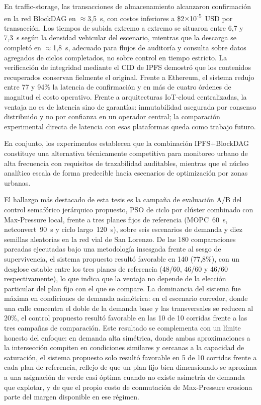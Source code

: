 En traffic-storage, las transacciones de almacenamiento alcanzaron confirmación en
la red BlockDAG en $\approx$3,5~s, con costos inferiores a \$2$\times$10\textsuperscript{-5}~USD
por transacción. Los tiempos de subida extremo a extremo se situaron entre 6,7 y 7,3~s según
la densidad vehicular del escenario, mientras que la descarga se completó en $\approx$1,8~s,
adecuado para flujos de auditoría y consulta sobre datos agregados de ciclos completados, no
sobre control en tiempo estricto. La verificación de integridad mediante el CID de IPFS
demostró que los contenidos recuperados conservan fielmente el original. Frente a Ethereum,
el sistema redujo entre 77 y 94\% la latencia de confirmación y en más de cuatro órdenes de
magnitud el costo operativo. Frente a arquitecturas IoT-cloud centralizadas, la ventaja no es de
latencia sino de garantías: inmutabilidad asegurada por consenso distribuido y no por
confianza en un operador central; la comparación experimental directa de latencia con esas
plataformas queda como trabajo futuro.

En conjunto, los experimentos establecen que la combinación IPFS+BlockDAG constituye una
alternativa técnicamente competitiva para monitoreo urbano de alta frecuencia con requisitos
de trazabilidad auditables, mientras que el núcleo analítico escala de forma predecible hacia
escenarios de optimización por zonas urbanas.

El hallazgo más destacado de esta tesis es la campaña de evaluación A/B del control
semafórico jerárquico propuesto, PSO de ciclo por clúster combinado con Max-Pressure local,
frente a tres planes fijos de referencia (MOPC~60~s, netconvert~90~s y ciclo largo~120~s),
sobre seis escenarios de demanda y diez semillas aleatorias en la red vial de San Lorenzo.
De las 180 comparaciones pareadas ejecutadas bajo una metodología insesgada frente al sesgo
de supervivencia, el sistema propuesto resultó favorable en 140 (77,8\%), con un desglose
estable entre los tres planes de referencia (48/60, 46/60 y 46/60 respectivamente), lo que
indica que la ventaja no depende de la elección particular del plan fijo con el que se
compare. La dominancia del sistema fue máxima en condiciones de demanda asimétrica: en el
escenario corredor, donde una calle concentra el doble de la demanda base y las transversales
se reducen al 20\%, el control propuesto resultó favorable en las 10 de 10 corridas frente a
las tres campañas de comparación. Este resultado se complementa con un límite honesto del
enfoque: en demanda alta simétrica, donde ambas aproximaciones a la intersección compiten en
condiciones similares y cercanas a la capacidad de saturación, el sistema propuesto solo
resultó favorable en 5 de 10 corridas frente a cada plan de referencia, reflejo de que un
plan fijo bien dimensionado se aproxima a una asignación de verde casi óptima cuando no
existe asimetría de demanda que explotar, y de que el propio costo de conmutación de
Max-Pressure erosiona parte del margen disponible en ese régimen.

